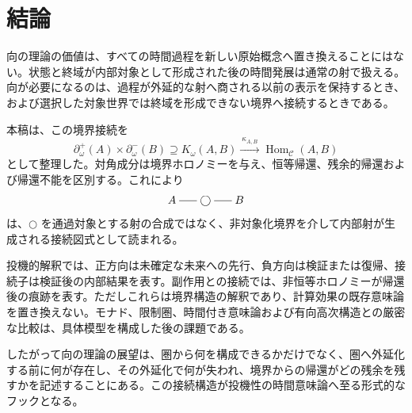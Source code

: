 \documentclass[a4paper,11pt]{ltjsarticle}
\theoremstyle{definition}
\theoremstyle{plain}
\newcommand{\Hom}{\operatorname{Hom}}
\newcommand{\dfix}{\bigcirc}
\newcommand{\dline}{\mathrel{\rule[0.55ex]{1.6em}{0.4pt}}}
\begin{document}
\section{結論}

向の理論の価値は、すべての時間過程を新しい原始概念へ置き換えることにはない。状態と終域が内部対象として形成された後の時間発展は通常の射で扱える。向が必要になるのは、過程が外延的な射へ商される以前の表示を保持するとき、および選択した対象世界では終域を形成できない境界へ接続するときである。

本稿は、この境界接続を
\[
 \boxed{
 \partial_\omega^+(A)
 \times
 \partial_\omega^-(B)
 \supseteq K_\omega(A,B)
 \xrightarrow{\ \kappa_{A,B}\ }
 \Hom_{\mathcal C}(A,B)
 }
\]
として整理した。対角成分は境界ホロノミーを与え、恒等帰還、残余的帰還および帰還不能を区別する。これにより
\[
 A\dline\dfix\dline B
\]
は、$\dfix$ を通過対象とする射の合成ではなく、非対象化境界を介して内部射が生成される接続図式として読まれる。

投機的解釈では、正方向は未確定な未来への先行、負方向は検証または復帰、接続子は検証後の内部結果を表す。副作用との接続では、非恒等ホロノミーが帰還後の痕跡を表す。ただしこれらは境界構造の解釈であり、計算効果の既存意味論を置き換えない。モナド、限制圏、時間付き意味論および有向高次構造との厳密な比較は、具体模型を構成した後の課題である。

したがって向の理論の展望は、圏から何を構成できるかだけでなく、圏へ外延化する前に何が存在し、その外延化で何が失われ、境界からの帰還がどの残余を残すかを記述することにある。この接続構造が投機性の時間意味論へ至る形式的なフックとなる。



\end{document}
